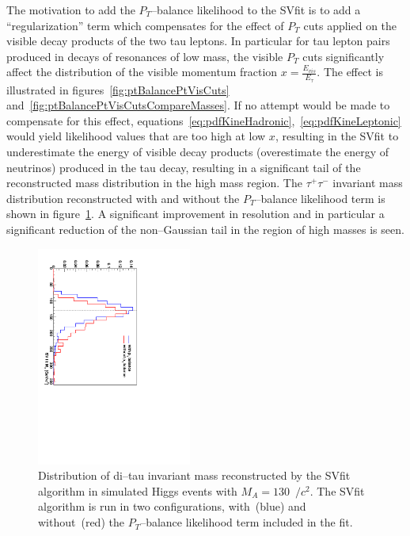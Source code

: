 The motivation to add the $P_{T}$--balance likelihood to the SVfit is to add a
``regularization'' term which compensates for the effect of $P_{T}$ cuts applied
on the visible decay products of the two tau leptons.  In particular for tau
lepton pairs produced in decays of resonances of low mass, the visible $P_{T}$
cuts significantly affect the distribution of the visible momentum fraction $x =
\frac{E_{vis}}{E_{\tau}}$.  The effect is illustrated in
figures~\ref{fig:ptBalancePtVisCuts}
and~\ref{fig:ptBalancePtVisCutsCompareMasses}.  If no attempt would be made to
compensate for this effect,
equations~\ref{eq:pdfKineHadronic},~\ref{eq:pdfKineLeptonic} would yield
likelihood values that are too high at low $x$, resulting in the SVfit to
underestimate the energy of visible decay products (overestimate the energy of
neutrinos) produced in the tau decay, resulting in a significant tail of the
reconstructed mass distribution in the high mass region.  The $\tau^{+}
\tau^{-}$ invariant mass distribution reconstructed with and without the
$P_{T}$--balance likelihood term is shown in
figure~\ref{fig:ptBalanceImprovedMassResolution}.  A significant improvement in
resolution and in particular a significant reduction of the non--Gaussian tail
in the region of high masses is seen.

\begin{figure}[t]
\begin{center}
\includegraphics*[height=72mm, angle=90]{svfit_chapter/figures/pt_balance_effect.pdf}
\caption{\captiontext Distribution of di--tau invariant mass reconstructed by
the SVfit algorithm in simulated Higgs events with $M_{A} = 130$~\GeV$/c^2$.
The SVfit algorithm is run in two configurations, with~(blue) and without~(red)
the $P_{T}$--balance likelihood term included in the fit. 
} \label{fig:ptBalanceImprovedMassResolution}
\end{center}
\end{figure} 

